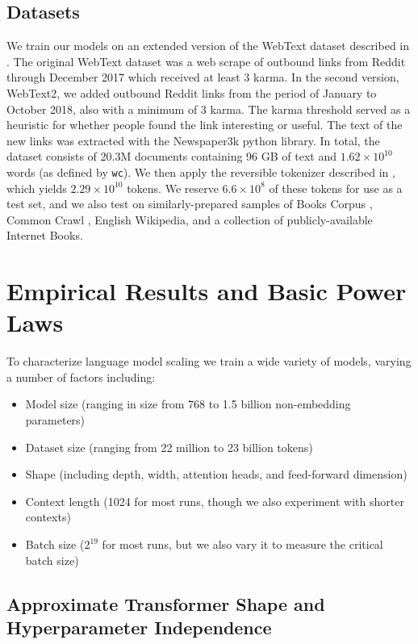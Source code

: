 \documentclass[english]{article}
\renewcommand{\arraystretch}{1.5}
\begin{document}
\subsection{Datasets}
We train our models on an extended version of the WebText dataset described in \cite{radford2019language}.  The original WebText dataset was a web scrape of outbound links from Reddit through December 2017 which received at least 3 karma. In the second version, WebText2, we added outbound Reddit links from the period of January to October 2018, also with a minimum of 3 karma. The karma threshold served as a heuristic for whether people found the link interesting or useful. The text of the new links was extracted with the Newspaper3k python library. In total, the dataset consists of 20.3M documents containing 96 GB of text and $1.62 \times 10^{10}$ words (as defined by \texttt{wc}). We then apply the reversible tokenizer described in \cite{radford2019language}, which yields $2.29 \times 10^{10}$ tokens.  We reserve $6.6 \times 10^{8}$ of these tokens for use as a test set, and we also test on similarly-prepared samples of Books Corpus \cite{Zhu_2015}, Common Crawl \cite{commoncrawl}, English Wikipedia, and a collection of publicly-available Internet Books.



\section{Empirical Results and Basic Power Laws}
\label{sec:Empirical}

To characterize language model scaling we train a wide variety of models, varying a number of factors including:
\begingroup
\renewcommand{\arraystretch}{1.1}
\begin{itemize}
\item Model size (ranging in size from 768 to 1.5 billion non-embedding parameters)
\item Dataset size (ranging from 22 million to 23 billion tokens)
\item Shape (including depth, width, attention heads, and feed-forward dimension)
\item Context length (1024 for most runs, though we also experiment with shorter contexts)
\item Batch size ($2^{19}$ for most runs, but we also vary it to measure the critical batch size)
\end{itemize}
\endgroup 

\subsection{Approximate Transformer Shape and Hyperparameter Independence}
\label{sec:ShapeIndependence}
\end{document}
